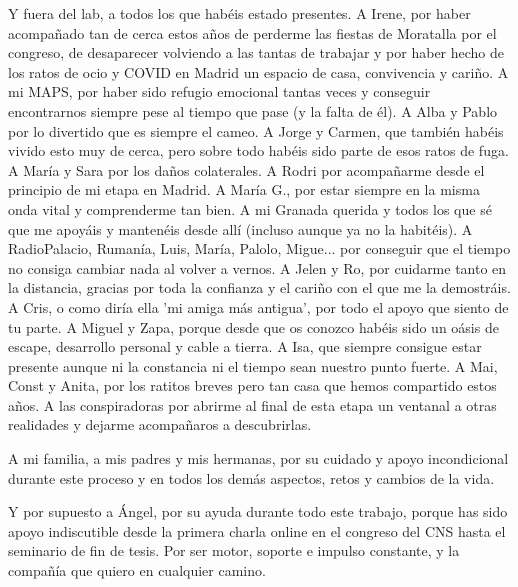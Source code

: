 Y fuera del lab, a todos los que habéis estado presentes. A Irene, por haber acompañado tan de cerca estos años de perderme las fiestas de Moratalla por el congreso, de desaparecer volviendo a las tantas de trabajar y por haber hecho de los ratos de ocio y COVID en Madrid un espacio de casa, convivencia y cariño. A mi MAPS, por haber sido refugio emocional tantas veces y conseguir encontrarnos siempre pese al tiempo que pase (y la falta de él). A Alba y Pablo por lo divertido que es siempre el cameo. A Jorge y Carmen, que también habéis vivido esto muy de cerca, pero sobre todo habéis sido parte de esos ratos de fuga. A María y Sara por los daños colaterales. A Rodri por acompañarme desde el principio de mi etapa en Madrid. A María G., por estar siempre en la misma onda vital y comprenderme tan bien. A mi Granada querida y todos los que sé que me apoyáis y mantenéis desde allí (incluso aunque ya no la habitéis). A RadioPalacio, Rumanía, Luis, María, Palolo, Migue... por conseguir que el tiempo no consiga cambiar nada al volver a vernos. A Jelen y Ro, por cuidarme tanto en la distancia, gracias por toda la confianza y el cariño con el que me la demostráis. A Cris, o como diría ella 'mi amiga más antigua', por todo el apoyo que siento de tu parte. A Miguel y Zapa, porque desde que os conozco habéis sido un oásis de escape, desarrollo personal y cable a tierra. A Isa, que siempre consigue estar presente aunque ni la constancia ni el tiempo sean nuestro punto fuerte. A Mai, Const y Anita, por los ratitos breves pero tan casa que hemos compartido estos años. A las conspiradoras por abrirme al final de esta etapa un ventanal a otras realidades y dejarme acompañaros a descubrirlas. 

A mi familia, a mis padres y mis hermanas, por su cuidado y apoyo incondicional durante este proceso y en todos los demás aspectos, retos y cambios de la vida. 

Y por supuesto a Ángel, por su ayuda durante todo este trabajo, porque has sido apoyo indiscutible desde la primera charla online en el congreso del CNS hasta el seminario de fin de tesis. Por ser motor, soporte e impulso constante, y la compañía que quiero en cualquier camino.
